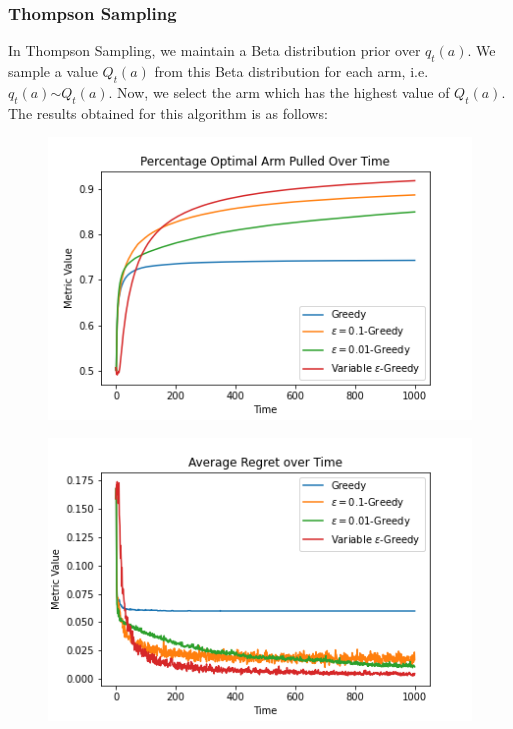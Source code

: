 \documentclass{article}
\begin{document}
		\subsubsection{Thompson Sampling}
		In Thompson Sampling, we maintain a Beta distribution prior over $q_{t}(a)$. We sample a value $Q_{t}(a)$ from this Beta distribution for each arm, i.e.
		$q_{t}(a) \stackrel{}{\sim} Q_{t}(a)$. Now, we select the arm which has the highest value of $Q_{t}(a)$. The results obtained for this algorithm is as 
		follows:
		
		\begin{figure}[H]
		\graphicspath{ {../Experiments/Bernoulli_2_Thompson_Sampling/} }
		\centering
		\begin{minipage}{.5\textwidth}
		  \centering
		  \includegraphics[width=\linewidth]{Percentage_Optimal_Arm_Pulled_Over_Time.png}
		  \label{fig:test1}
		\end{minipage}%
		\begin{minipage}{.5\textwidth}
		  \centering
		  \includegraphics[width=\linewidth]{Average_Regret_over_Time.png}
		  \label{fig:test2}
		\end{minipage}
		\end{figure}
		
\end{document}
